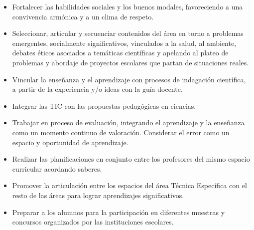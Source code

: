 \documentclass[../main]{subfiles}
\begin{document}
\begin{itemize}
\item Fortalecer las habilidades sociales y los buenos modales, favoreciendo a una convivencia armónica y a un clima de respeto. 

\item Seleccionar, articular y secuenciar contenidos del área en torno a problemas emergentes, socialmente significativos, vinculados a la salud, al ambiente, debates éticos asociados a temáticas científicas y apelando al plateo de problemas y abordaje de proyectos escolares que partan de situaciones reales. 

\item Vincular la enseñanza y el aprendizaje con procesos de indagación científica, a partir de la experiencia y/o ideas con la guía docente. 

\item Integrar las TIC con las propuestas pedagógicas en ciencias. 

\item Trabajar en proceso de evaluación, integrando el aprendizaje y la enseñanza como un momento continuo de valoración. Considerar el error como un espacio y oportunidad de aprendizaje. 

\item Realizar las planificaciones en conjunto entre los profesores del mismo espacio curricular acordando saberes. 

\item Promover la articulación entre los espacios del área Técnica Específica con el resto de las áreas para lograr aprendizajes significativos.  

\item Preparar a los alumnos para la participación en diferentes muestras y concursos organizados por las instituciones escolares. 

\end{itemize}

\newpage
\end{document}

